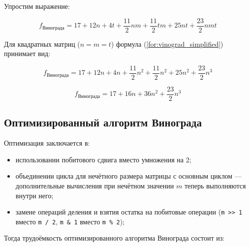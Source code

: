 Упростим выражение:

\begin{equation}
	\label{for:vinograd_simplified}
	f_{\text{Винограда}} = 17 + 12n + 4t + \frac{11}{2}nm + \frac{11}{2}tm + 25nt + \frac{23}{2}nmt
\end{equation}

Для квадратных матриц (\( n = m = t \)) формула (\ref{for:vinograd_simplified}) принимает вид:

\begin{equation}
	\label{for:vinograd_square}
	f_{\text{Винограда}} = 17 + 12n + 4n + \frac{11}{2}n^2 + \frac{11}{2}n^2 + 25n^2 + \frac{23}{2}n^3
\end{equation}

\begin{equation}
	\label{for:vinograd_final}
	f_{\text{Винограда}} = 17 + 16n + 36n^2 + \frac{23}{2}n^3
\end{equation}

\subsection{Оптимизированный алгоритм Винограда}

Оптимизация заключается в:

\begin{itemize}
	\item использовании побитового сдвига вместо умножения на 2;
	\item объединении цикла для нечётного размера матрицы с основным циклом — дополнительные вычисления при нечётном значении $m$ теперь выполняются внутри него;
	\item замене операций деления и взятия остатка на побитовые операции (\texttt{m >> 1} вместо \texttt{m / 2}, \texttt{m \& 1} вместо \texttt{m \% 2}); \newline
\end{itemize}

Тогда трудоёмкость оптимизированного алгоритма Винограда состоит из:


